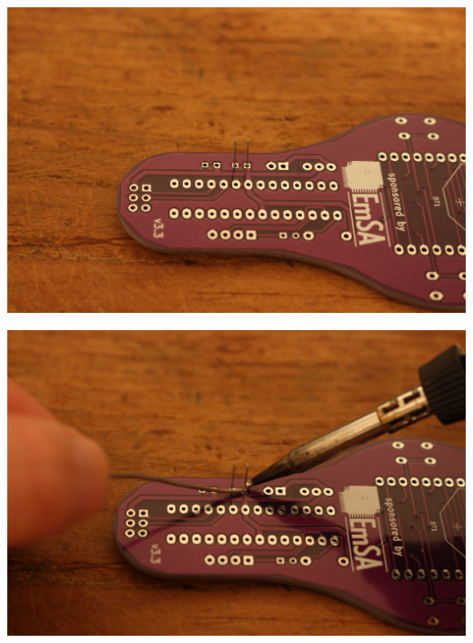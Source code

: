 \documentclass{article}
\begin{document}
\vspace{0.5cm}

\begin{minipage}[b]{0.5\textwidth}
	\includegraphics[width=\textwidth]{Bilder2024/IMG_0033.JPG}
\end{minipage}
\begin{minipage}[b]{0.5\textwidth}
	\includegraphics[width=\textwidth]{Bilder2024/IMG_0034.JPG}
\end{minipage}

\vspace{0.5cm}
\end{document}
